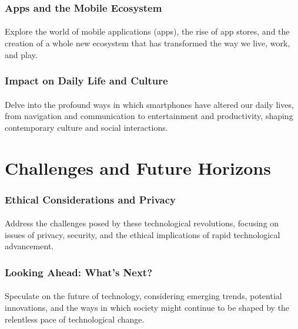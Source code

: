 \documentclass[a4paper,12pt]{book}
\begin{document}
\subsubsection*{Apps and the Mobile Ecosystem}
\paragraph{}
Explore the world of mobile applications (apps), the rise of app stores, and the creation of a whole new ecosystem that has transformed the way we live, work, and play.

\subsubsection*{Impact on Daily Life and Culture}
\paragraph{}
Delve into the profound ways in which smartphones have altered our daily lives, from navigation and communication to entertainment and productivity, shaping contemporary culture and social interactions.

\section*{Challenges and Future Horizons}
\paragraph{}
\subsubsection*{Ethical Considerations and Privacy}
\paragraph{}
Address the challenges posed by these technological revolutions, focusing on issues of privacy, security, and the ethical implications of rapid technological advancement.

\subsubsection*{Looking Ahead: What’s Next?}
\paragraph{}
Speculate on the future of technology, considering emerging trends, potential innovations, and the ways in which society might continue to be shaped by the relentless pace of technological change.
\end{document}
